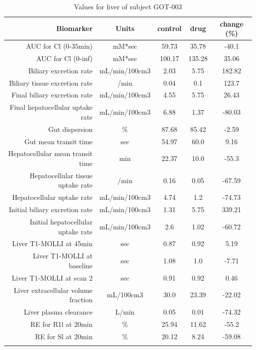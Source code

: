 \documentclass{epflreport}%
\begin{document}
%
\clearpage%
\begin{longtable}{rcccc}%
\hline%
Biomarker&Units&control&drug&change (\%)\\%
\hline%
AUC for Cl (0{-}35min)&mM*sec&59.73&35.78&{-}40.1\\%
AUC for Cl (0{-}inf)&mM*sec&100.17&135.28&35.06\\%
Biliary excretion rate&mL/min/100cm3&2.03&5.75&182.82\\%
Biliary tissue excretion rate&/min&0.04&0.1&123.7\\%
Final biliary excretion rate&mL/min/100cm3&4.55&5.75&26.43\\%
Final hepatocellular uptake rate&mL/min/100cm3&6.88&1.37&{-}80.03\\%
Gut dispersion&\%&87.68&85.42&{-}2.59\\%
Gut mean transit time&sec&54.97&60.0&9.16\\%
Hepatocellular mean transit time&min&22.37&10.0&{-}55.3\\%
Hepatocellular tissue uptake rate&/min&0.16&0.05&{-}67.59\\%
Hepatocellular uptake rate&mL/min/100cm3&4.74&1.2&{-}74.73\\%
Initial biliary excretion rate&mL/min/100cm3&1.31&5.75&339.21\\%
Initial hepatocellular uptake rate&mL/min/100cm3&2.6&1.02&{-}60.72\\%
Liver T1{-}MOLLI at 45min&sec&0.87&0.92&5.19\\%
Liver T1{-}MOLLI at baseline&sec&1.08&1.0&{-}7.71\\%
Liver T1{-}MOLLI at scan 2&sec&0.91&0.92&0.46\\%
Liver extracellular volume fraction&mL/100cm3&30.0&23.39&{-}22.02\\%
Liver plasma clearance&L/min&0.05&0.01&{-}74.32\\%
RE for R1l at 20min&\%&25.94&11.62&{-}55.2\\%
RE for Sl at 20min&\%&20.12&8.24&{-}59.08\\%
\hline%
\caption{Values for liver of subject GOT-003} \\%
\end{longtable}%
\end{document}
